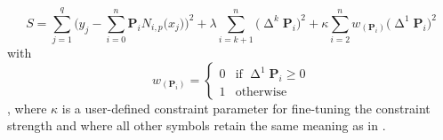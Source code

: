 \begin{equation}
  \label{eq:PSplineOLSMonotoneIncreasingConstraint}
  S =
  \sum_{j = 1}^q 
  \Biggl(
  y_j - \sum_{i = 0}^n \symbf{P}_i N_{i, p}\bigl(x_j\bigr)
  \Biggr)^2
  + \lambda \sum_{i = k + 1}^n \bigl(\upDelta^k \symbf{P}_i\bigr)^2
  + \kappa \sum_{i = 2}^n w_{(\symbf{P}_i)}\bigl(\upDelta^1 \symbf{P}_i\bigr)^2
\end{equation}
with
\begin{equation}
  \label{eq:PSlineOLSMonotoneIncreasingConstraintWFunction}
  w_{(\symbf{P}_i)} =
  \begin{cases}
    0 &\text{if } \upDelta^1 \symbf{P}_i \geq 0 \\
    1 &\text{otherwise}
  \end{cases}
\end{equation}
\parencite{Bollaerts2006}, where \(\kappa\) is a user-defined constraint parameter for fine-tuning the constraint strength and where all other symbols retain the same meaning as in .

